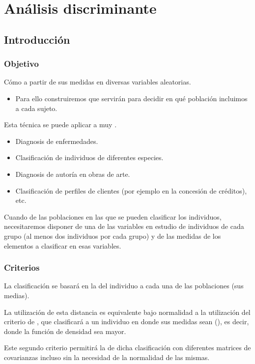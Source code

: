\section{Análisis discriminante}
\subsection{Introducción}
\subsubsection{Objetivo}
Cómo  a partir de sus medidas en diversas variables aleatorias.
\begin{itemize}
	\item Para ello construiremos  que servirán para decidir en qué población incluimos a cada sujeto.
\end{itemize}
Esta técnica se puede aplicar a muy .
\begin{itemize}
	\item Diagnosis de enfermedades.
	\item Clasificación de individuos de diferentes especies.
	\item Diagnosis de autoría en obras de arte.
	\item Clasificación de perfiles de clientes (por ejemplo en la concesión de créditos), etc.
\end{itemize}
Cuando  de las poblaciones en las que se pueden clasificar los individuos, necesitaremos disponer de una  de las variables en estudio de individuos de cada grupo (al menos dos individuos por cada grupo) y de las medidas de los elementos a clasificar en esas variables.
\subsubsection{Criterios}
La clasificación se basará en la  del individuo a cada una de las poblaciones (sus medias).

La utilización de esta distancia es equivalente bajo normalidad a la utilización del criterio de , que clasificará a un individuo en donde sus medidas sean  (), es decir, donde la función de densidad sea mayor.

Este segundo criterio permitirá la  de dicha clasificación  con diferentes matrices de covarianzas incluso sin la necesidad de la normalidad de las mismas.
